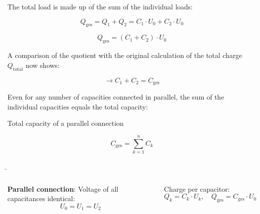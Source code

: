 \begin{frame}
{		The total load is made up of the sum of the individual loads:
		
		
		\begin{equation*}
			Q_\mathrm{ges} = Q_1 + Q_2 = C_1 \cdot U_0 + C_2 \cdot U_0 
		\end{equation*}
		
		
		
		\begin{equation*}
			Q_\mathrm{ges} =  (C_1 + C_2) \cdot U_0 
		\end{equation*}
		
		A comparison of the quotient with the original calculation of the total charge $Q_\mathrm{total}$ now shows:
		
		
		
		\begin{equation*}
			\rightarrow C_1 + C_2 = C_\mathrm{ges}
		\end{equation*}
		
		Even for any number of capacities connected in parallel, the sum of the individual capacities equals the total capacity:
		
		
		\begin{Key point}{Total capacity of a parallel connection}
			
			\begin{equation*}
				C_\mathrm{ges} = \sum_{k=1}^{n} C_k 
			\end{equation*}
			
		\end{Key point}
		
	}
	
	
	
	\b{
		\begin{columns}
			\vspace*{-110pt}
			
			\textbf{Parallel connection}: Voltage of all capacitances identical: \\
			
			\vspace*{-10pt}
			\begin{equation*}
				U_0 = U_1 = U_2	
			\end{equation*}
			
			Charge per capacitor:
			\begin{equation*}
				Q_k = C_k \cdot U_k, \quad Q_\mathrm{ges} = C_\mathrm{ges} \cdot U_0
			\end{equation*}
			

\end{columns}}
\end{frame}
